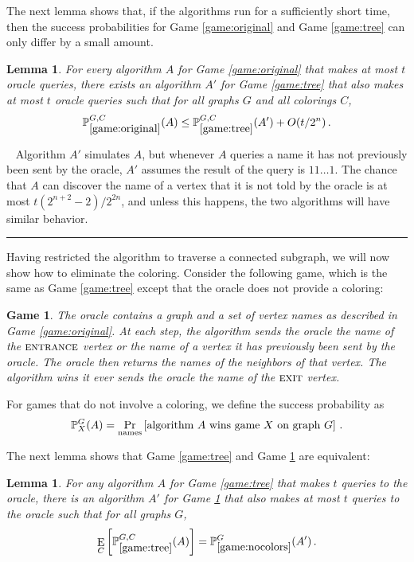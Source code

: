 \documentclass[aps,11pt,twoside,nofootinbib,tightenlines,superscriptaddress,preprintnumbers]{revtex4}
\newcommand{\<}{\langle}
\renewcommand{\>}{\rangle}
\newcommand{\be}{\begin{equation}}
\newcommand{\ee}{\end{equation}}
\newcommand{\ent}{{\textsc{entrance}}}
\newcommand{\exit}{{\textsc{exit}}}
\newcommand\symProb{\mathop{\mathrm{Pr}}\displaylimits}
\newcommand\symExpec{\mathop{\mathrm{E}}\displaylimits}
\def\prob#1#2{\symProb_{#1}\left[ #2 \right]}
\def\expec#1#2{\symExpec_{#1}\left[ #2 \right]}
\newtheorem{lemma}[theorem]{Lemma}
\newtheorem{game}{Game}
\newcommand{\qed}{\rule{7pt}{7pt}}
\newenvironment{proof}
  {\trivlist\item\noindent{\bf Proof}~}
  {\qed\endtrivlist}
\begin{document}
\noindent
The next lemma shows that, if the algorithms run for a sufficiently short time,
then the success probabilities
for Game \ref{game:original} and Game \ref{game:tree} can only differ by a
small amount.

\begin{lemma}
For every algorithm $A$ for Game \ref{game:original} that makes at most
$t$ oracle queries, there exists an algorithm $A'$ for Game
\ref{game:tree} that also makes at most $t$ oracle queries such that for
all graphs $G$ and all colorings $C$,
\be
  \mathbb{P}_{\ref{game:original}}^{G,C} (A)
    \le \mathbb{P}_{\ref{game:tree}}^{G,C} (A') + O(t/2^{n})
\,.
\ee
\end{lemma}

\begin{proof}
Algorithm $A'$ simulates $A$, but whenever $A$ queries a name it has not
previously been sent by the oracle, $A'$ assumes the result of the query
is $11\ldots1$.  The chance that $A$ can discover the name of a vertex
that it is not told by the oracle is at most $t (2^{n+2}-2) / 2^{2n}$, and
unless this happens, the two algorithms will have similar behavior.
\end{proof}

Having restricted the algorithm to traverse a connected subgraph, we will
now show how to eliminate the coloring.  Consider the following game,
which is the same as Game \ref{game:tree} except that the oracle does not
provide a coloring:

\begin{game}\label{game:nocolors}
  The oracle contains a graph and a set of vertex names as described in
  Game \ref{game:original}.
%
  At each step, the algorithm sends the oracle the name of the $\ent$
  vertex or the name of a vertex it has previously been sent by the
  oracle.  The oracle then returns the names of the neighbors of that
  vertex.
%
  The algorithm wins it ever sends the oracle the name of the $\exit$
  vertex.
\end{game}

\noindent
For games that do not involve a coloring, we define the success
probability as
\be
  \mathbb{P}_{X}^G(A)
 = 
  \prob{\mathrm{names}}
       {\mbox{\rm algorithm $A$ wins game $X$ on graph $G$}}
\,.
\ee

\noindent
The next lemma shows that Game \ref{game:tree} and Game
\ref{game:nocolors} are equivalent:

\begin{lemma}
For any algorithm $A$ for Game \ref{game:tree} that makes $t$ queries to
the oracle, there is an algorithm $A'$ for Game \ref{game:nocolors} that
also makes at most $t$ queries to the oracle such that for all graphs $G$,
\be
  \expec{C}{\mathbb{P}_{\ref{game:tree}}^{G,C}(A)} 
          = \mathbb{P}_{\ref{game:nocolors}}^G(A') \,.
\ee
\end{lemma}
\end{document}
